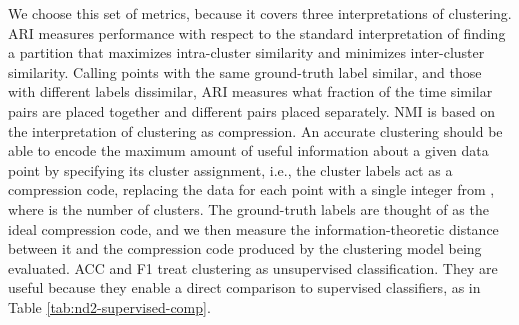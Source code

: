 \documentclass[wcp]{jmlr}
\begin{document}
 We choose this set of metrics, because it covers three interpretations of clustering. ARI measures performance with respect to the standard interpretation of finding a partition that maximizes intra-cluster similarity and minimizes inter-cluster similarity. Calling points with the same ground-truth label similar, and those with different labels dissimilar, ARI measures what fraction of the time similar pairs are placed together and different pairs placed separately.
NMI is based on the interpretation of clustering as compression. An accurate clustering should be able to encode the maximum amount of useful information about a given data point by specifying its cluster assignment, i.e., the cluster labels act as a compression code, replacing the data for each point with a single integer from , where  is the number of clusters. The ground-truth labels are thought of as the ideal compression code, and we then measure the information-theoretic distance between it and the compression code produced by the clustering model being evaluated.
ACC and F1 treat clustering as unsupervised classification. They are useful because they enable a direct comparison to supervised classifiers, as in Table \ref{tab:nd2-supervised-comp}. 
\end{document}
